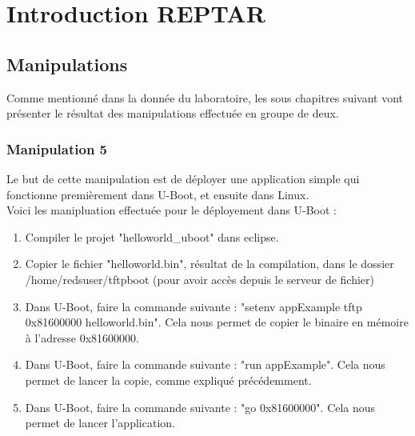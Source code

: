 
\chapter{Introduction REPTAR} %

\label{Chapitre 2} %


\section{Manipulations}

Comme mentionné dans la donnée du laboratoire, les sous chapitres suivant vont présenter le résultat des manipulations effectuée en groupe de deux.

\subsection{Manipulation 5}
Le but de cette manipulation est de déployer une application simple qui fonctionne premièrement dans U-Boot, et ensuite dans Linux.\\

Voici les manipluation effectuée pour le déployement dans U-Boot :
\begin{enumerate}
\item Compiler le projet "helloworld\_uboot" dans eclipse.
\item Copier le fichier "helloworld.bin", résultat de la compilation, dans le dossier /home/redsuser/tftpboot (pour avoir accès depuis le serveur de fichier)
\item Dans U-Boot, faire la commande suivante : "setenv appExample tftp 0x81600000 helloworld.bin". Cela nous permet de copier le binaire en mémoire à l'adresse 0x81600000.
\item Dans U-Boot, faire la commande suivante : "run appExample". Cela nous permet de lancer la copie, comme expliqué précédemment.
\item Dans U-Boot, faire la commande suivante : "go 0x81600000". Cela nous permet de lancer l'application.\\
\end{enumerate}

